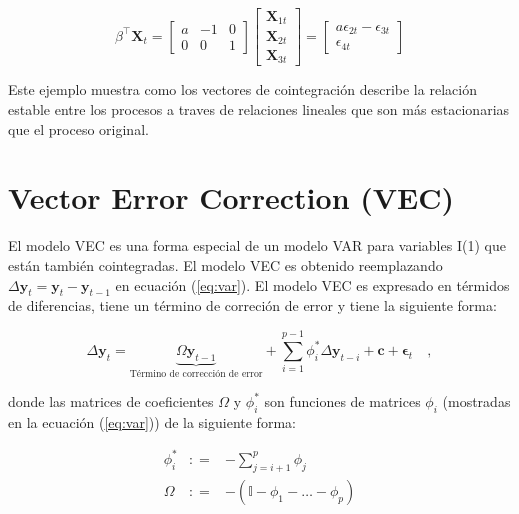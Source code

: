 \[
\beta^\intercal \mathbf{X}_t = 
\begin{bmatrix}
a & -1 & 0 \\
0 & 0 & 1
\end{bmatrix} 
\begin{bmatrix} 
\mathbf{X}_{1t} \\
\mathbf{X}_{2t} \\
\mathbf{X}_{3t}
\end{bmatrix} = 
\begin{bmatrix}
a\epsilon_{2t} - \epsilon_{3t} \\
\epsilon_{4t}
\end{bmatrix}
\]

Este ejemplo muestra como los vectores de cointegración describe la relación
estable entre los procesos a traves de relaciones lineales que son más
estacionarias que el proceso original.

\section{Vector Error Correction (VEC)}

El modelo VEC es una forma especial de un modelo VAR para variables I(1) que
están también cointegradas. El modelo VEC es obtenido reemplazando
$\Delta \mathbf{y}_t = \mathbf{y}_t - \mathbf{y}_{t-1}$ en ecuación
(\ref{eq:var}). El modelo VEC es expresado en térmidos de diferencias,
tiene un término de correción de error y tiene la siguiente forma:

\begin{equation}
 \label{eq:vec}
  \Delta \mathbf{y}_t = 
   \underbrace{ \Omega\mathbf{y}_{t-1}}_\text{Término de corrección de error} + 
    \sum_{i=1}^{p-1}
    \phi_i^* \Delta \mathbf{y}_{t-i}  + \mathbf{c} + \mathbf{\epsilon}_t \quad ,
    \end{equation}

    \noindent donde las matrices de coeficientes $\Omega$ y $\phi_i^*$ son
    funciones de matrices $\phi_i$ (mostradas en la ecuación (\ref{eq:var})) de
    la siguiente forma:

    \begin{eqnarray*}
    \phi_i^* &: =& -\sum_{j=i+1}^{p} \phi_j \\
    \Omega &: =& -(\mathbb{I}-\phi_1-\dots-\phi_p) 
    \end{eqnarray*}

